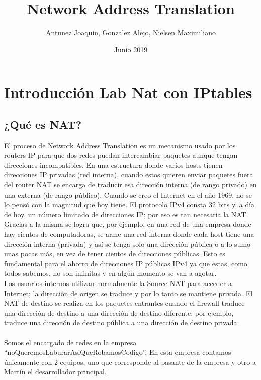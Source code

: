 \documentclass{article}
\title {Network Address Translation}
\author{Antunez Joaquin, Gonzalez Alejo, Nielsen Maximiliano}
\date{Junio 2019}
\begin{document}
 
\begin{titlepage}
\pagestyle{empty}
\maketitle
\thispagestyle{empty}
\end{titlepage}

\section*{Introducción Lab Nat con IPtables}

\subsection*{¿Qué es NAT?}

El proceso de Network Address Translation es un mecanismo usado por los routers IP para que dos redes puedan intercambiar paquetes aunque tengan direcciones incompatibles.
En una estructura donde varios hosts tienen direcciones IP privadas (red interna), cuando estos quieren enviar paquetes fuera del router NAT se encarga de traducir esa dirección interna (de rango privado) en una externa (de rango público).
Cuando se creo el Internet en el año 1969, no se lo pensó con la magnitud que hoy tiene.
El protocolo IPv4 consta 32 bits y, a día de hoy, un número limitado de direcciones IP; por eso es tan necesaria la NAT. Gracias a la misma se logra que, por ejemplo, en una red de una empresa donde hay cientos de computadoras, se arme una red interna donde cada host tiene una dirección interna (privada) y así se tenga solo una dirección pública o a lo sumo unas pocas más, en vez de tener cientos de direcciones públicas. Esto es fundamental para el ahorro de direcciones IP públicas IPv4 ya que estas, como todos sabemos, no son infinitas y en algún momento se van a agotar.\\
Los usuarios internos utilizan normalmente la Source NAT para acceder a Internet; la dirección de origen se traduce y por lo tanto se mantiene privada.
El NAT de destino se realiza en los paquetes entrantes cuando el firewall traduce una dirección de destino a una dirección de destino diferente; por ejemplo, traduce una dirección de destino pública a una dirección de destino privada.
\\ \hfill\\
Somos el encargado de redes en la empresa “noQueremosLaburarAsiQueRobamosCodigo”. En esta empresa contamos únicamente con 2 equipos, uno que corresponde al pasante de la empresa y otro a Martín el desarrollador principal.\\ 
\end{document}
